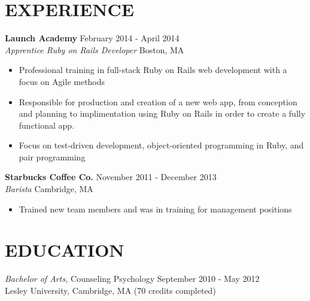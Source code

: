 \documentclass[margin]{res}
\begin{document}
\begin{resume}
  
\section{EXPERIENCE}  {\bf Launch Academy} \hfill February 2014 - April 2014 \\
			{\sl Apprentice Ruby on Rails Developer} \hfill Boston, MA \
			\begin{itemize}  \itemsep -2pt %
			\item Professional training in full-stack Ruby on Rails web development with a focus on Agile methods
			\item  Responsible for production and creation of a new web app, from conception and planning to implimentation using Ruby on Rails in order to create a fully functional app.
			\item Focus on test-driven development, object-oriented programming in Ruby, and pair programming

			\end{itemize}
			{\bf Starbucks Coffee Co.} \hfill November 2011 - December 2013 \\
			{\sl Barista } \hfill Cambridge, MA \
			\begin{itemize} \itemsep -2pt %
			\item Trained new team members and was in training for management positions
			\end{itemize}

\section{EDUCATION} {\sl Bachelor of Arts,} Counseling Psychology \hfill September 2010 - May 2012\\
                Lesley University, Cambridge, MA 
                 (70 credits completed) \\
                
 
\end{resume}
\end{document}

